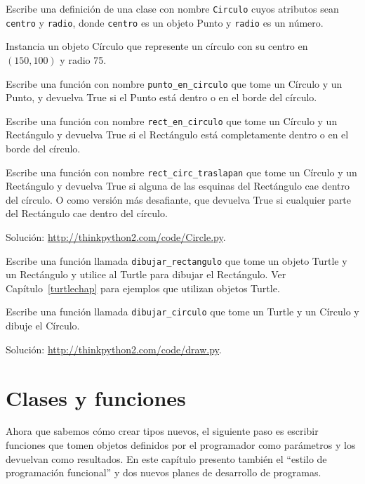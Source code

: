 \documentclass[10pt]{book}
\begin{document}
\begin{exercise}

Escribe una definición de una clase con nombre {\tt Circulo} cuyos atributos sean
{\tt centro} y {\tt radio}, donde {\tt centro} es un objeto Punto
y {\tt radio} es un número.

Instancia un objeto Círculo que represente un círculo con su centro
en $(150, 100)$ y radio 75.

Escribe una función con nombre \verb"punto_en_circulo" que tome un Círculo y
un Punto, y devuelva True si el Punto está dentro o en el borde del
círculo.

Escribe una función con nombre \verb"rect_en_circulo" que tome un Círculo y un
Rectángulo y devuelva True si el Rectángulo está completamente dentro o en el borde
del círculo.

Escribe una función con nombre \verb"rect_circ_traslapan" que tome un Círculo
y un Rectángulo y devuelva True si alguna de las esquinas del Rectángulo cae
dentro del círculo.  O como versión más desafiante, que devuelva True si
cualquier parte del Rectángulo cae dentro del círculo.

Solución: \url{http://thinkpython2.com/code/Circle.py}.

\end{exercise}


\begin{exercise}

Escribe una función llamada \verb"dibujar_rectangulo" que tome un objeto Turtle
y un Rectángulo y utilice al Turtle para dibujar el Rectángulo.  Ver
Capítulo~\ref{turtlechap} para ejemplos que utilizan objetos Turtle.

Escribe una función llamada \verb"dibujar_circulo" que tome un Turtle y
un Círculo y dibuje el Círculo.

Solución: \url{http://thinkpython2.com/code/draw.py}.

\end{exercise}



\chapter{Clases y funciones}
\label{time}

Ahora que sabemos cómo crear tipos nuevos, el siguiente
paso es escribir funciones que tomen objetos definidos por el programador
como parámetros y los devuelvan como resultados.  En este capítulo
presento también el ``estilo de programación funcional'' y dos nuevos
planes de desarrollo de programas.
\end{document}
